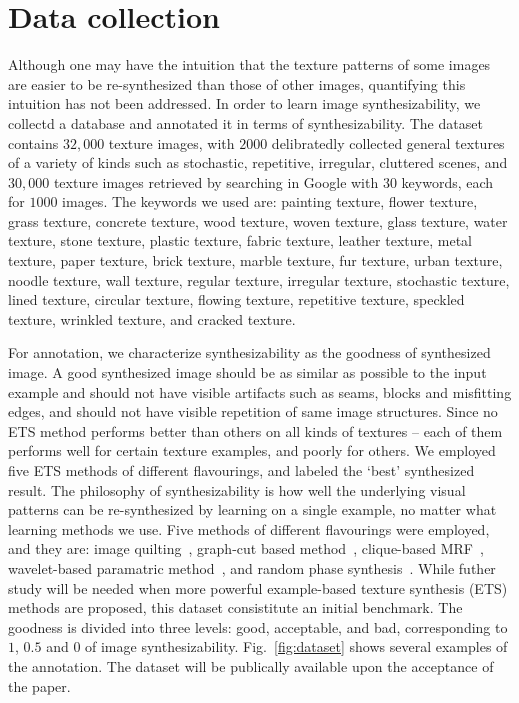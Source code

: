 \section{Data collection}
Although one may have the intuition that the texture patterns of some
images are easier to be re-synthesized than those of other images,
quantifying this intuition has not been addressed. In order to learn
image synthesizability, we collectd a database and annotated it in
terms of synthesizability. The dataset contains $32,000$ texture
images, with $2000$ delibratedly collected general textures of a
variety of kinds such as stochastic, repetitive, irregular, cluttered
scenes, and $30,000$ texture images retrieved by searching in Google
with $30$ keywords, each for $1000$ images. The keywords we used are:
painting texture, flower texture, grass texture, concrete texture,
wood texture, woven texture, glass texture, water texture, stone
texture, plastic texture, fabric texture, leather texture, metal
texture, paper texture, brick texture, marble texture, fur texture,
urban texture, noodle texture, wall texture, regular
texture, irregular texture, stochastic texture, lined texture,
circular texture, flowing texture, repetitive texture, speckled
texture, wrinkled texture, and cracked texture.

For annotation, we characterize synthesizability as the goodness of
synthesized image. A good synthesized image should be as similar as
possible to the input example and should not have visible artifacts
such as seams, blocks and misfitting edges, and should not have
visible repetition of same image structures. Since no ETS method
performs better than others on all kinds of textures -- each of them
performs well for certain texture examples, and poorly for others.  We
employed five ETS methods of different flavourings, and labeled the
`best' synthesized result. The philosophy of synthesizability is how
well the underlying visual patterns can be re-synthesized by learning
on a single example, no matter what learning methods we use.  Five
methods of different flavourings were employed, and they are: image
quilting~\cite{Efros:sig2001}, graph-cut based
method~\cite{Kwatra:2003}, clique-based MRF~\cite{Zalesny05},
wavelet-based paramatric method~\cite{Portilla:2000:IJCV}, and random
phase synthesis~\cite{random:phase}. While futher study will be needed
when more powerful example-based texture synthesis (ETS) methods are
proposed, this dataset consistitute an initial benchmark.  The
goodness is divided into three levels: good, acceptable, and bad,
corresponding to $1$, $0.5$ and $0$ of image synthesizability.
Fig.~\ref{fig:dataset} shows several examples of the annotation.  The
dataset will be publically available upon the acceptance of the paper.

